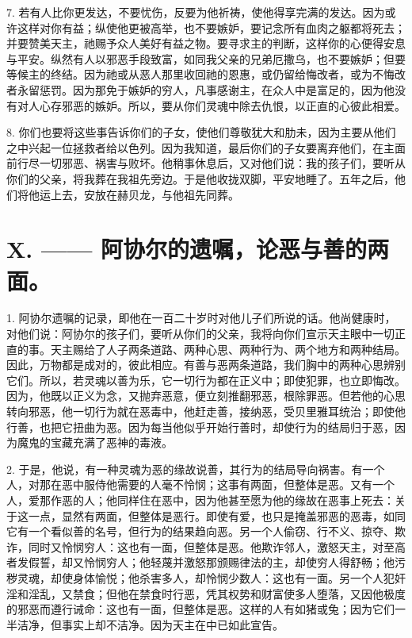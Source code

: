 7. 若有人比你更发达，不要忧伤，反要为他祈祷，使他得享完满的发达。因为或许这样对你有益；纵使他更被高举，也不要嫉妒，要记念所有血肉之躯都将死去；并要赞美天主，祂赐予众人美好有益之物。要寻求主的判断，这样你的心便得安息与平安。纵然有人以邪恶手段致富，如同我父亲的兄弟厄撒乌，也不要嫉妒；但要等候主的终结。因为祂或从恶人那里收回祂的恩惠，或仍留给悔改者，或为不悔改者永留惩罚。因为那免于嫉妒的穷人，凡事感谢主，在众人中是富足的，因为他没有对人心存邪恶的嫉妒。所以，要从你们灵魂中除去仇恨，以正直的心彼此相爱。\par

8. 你们也要将这些事告诉你们的子女，使他们尊敬犹大和肋未，因为主要从他们之中兴起一位拯救者给以色列。因为我知道，最后你们的子女要离弃他们，在主面前行尽一切邪恶、祸害与败坏。他稍事休息后，又对他们说：我的孩子们，要听从你们的父亲，将我葬在我祖先旁边。于是他收拢双脚，平安地睡了。五年之后，他们将他运上去，安放在赫贝龙，与他祖先同葬。\par


\section{X. —— 阿协尔的遗嘱，论恶与善的两面。}

1. 阿协尔遗嘱的记录，即他在一百二十岁时对他儿子们所说的话。他尚健康时，对他们说：阿协尔的孩子们，要听从你们的父亲，我将向你们宣示天主眼中一切正直的事。天主赐给了人子两条道路、两种心思、两种行为、两个地方和两种结局。因此，万物都是成对的，彼此相应。有善与恶两条道路，我们胸中的两种心思辨别它们。所以，若灵魂以善为乐，它一切行为都在正义中；即使犯罪，也立即悔改。因为，他既以正义为念，又抛弃恶意，便立刻推翻邪恶，根除罪恶。但若他的心思转向邪恶，他一切行为就在恶毒中，他赶走善，接纳恶，受贝里雅耳统治；即使他行善，也把它扭曲为恶。因为每当他似乎开始行善时，却使行为的结局归于恶，因为魔鬼的宝藏充满了恶神的毒液。\par

2. 于是，他说，有一种灵魂为恶的缘故说善，其行为的结局导向祸害。有一个人，对那在恶中服侍他需要的人毫不怜悯；这事有两面，但整体是恶。又有一个人，爱那作恶的人；他同样住在恶中，因为他甚至愿为他的缘故在恶事上死去：关于这一点，显然有两面，但整体是恶行。即使有爱，也只是掩盖邪恶的恶毒，如同它有一个看似善的名号，但行为的结果趋向恶。另一个人偷窃、行不义、掠夺、欺诈，同时又怜悯穷人：这也有一面，但整体是恶。他欺诈邻人，激怒天主，对至高者发假誓，却又怜悯穷人；他轻蔑并激怒那颁赐律法的主，却使穷人得舒畅；他污秽灵魂，却使身体愉悦；他杀害多人，却怜悯少数人：这也有一面。另一个人犯奸淫和淫乱，又禁食；但他在禁食时行恶，凭其权势和财富使多人堕落，又因他极度的邪恶而遵行诫命：这也有一面，但整体是恶。这样的人有如猪或兔；因为它们一半洁净，但事实上却不洁净。因为天主在中已如此宣告。\par

